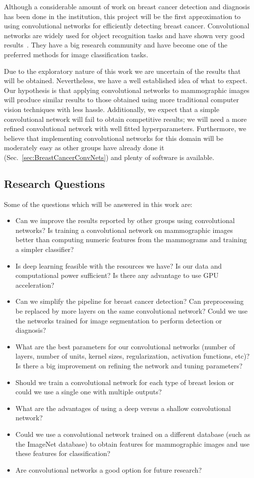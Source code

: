 Although a considerable amount of work on breast cancer detection and diagnosis has been done in the institution, this project will be the first approximation to using convolutional networks for efficiently detecting breast cancer. Convolutional networks are widely used for object recognition tasks and have shown very good results~\cite{Russakovsky2015, Taigman2014, Dieleman2015}. They have a big research community and have become one of the preferred methods for image classification tasks.

Due to the exploratory nature of this work we are uncertain of the results that will be obtained. Nevertheless, we have a well established idea of what to expect. Our hypothesis is that applying convolutional networks to mammographic images will produce similar results to those obtained using more traditional computer vision techniques with less hassle. Additionally, we expect that a simple convolutional network will fail to obtain competitive results; we will need a more refined convolutional network with well fitted hyperparameters. Furthermore, we believe that implementing convolutional networks for this domain will be moderately easy as other groups have already done it (Sec.~\ref{sec:BreastCancerConvNets}) and plenty of software is available.

\subsection{Research Questions}
Some of the questions which will be answered in this work are:
\begin{itemize} 
	\item Can we improve the results reported by other groups using convolutional networks? Is training a convolutional network on mammographic images better than computing numeric features from the mammograms and training a simpler classifier?
	\item Is deep learning feasible with the resources we have? Is our data and computational power sufficient? Is there any advantage to use GPU acceleration?
	\item Can we simplify the pipeline for breast cancer detection? Can preprocessing be replaced by more layers on the same convolutional network? Could we use the networks trained for image segmentation to perform detection or diagnosis?
	\item What are the best parameters for our convolutional networks (number of layers, number of units, kernel sizes, regularization, activation functions, etc)? Is there a big improvement on refining the network and tuning parameters?
	\item Should we train a convolutional network for each type of breast lesion or could we use a single one with multiple outputs?
	\item What are the advantages of using a deep versus a shallow convolutional network? 
	\item Could we use a convolutional network trained on a different database (such as the ImageNet database) to obtain features for mammographic images and use these features for classification?
	\item Are convolutional networks a good option for future research?
\end{itemize}

